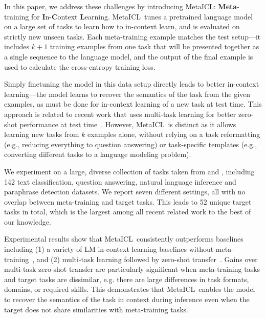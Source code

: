 In this paper, we address these challenges by introducing MetaICL: \textbf{Meta}-training for \textbf{I}n-\textbf{C}ontext \textbf{L}earning. MetaICL\ tunes a pretrained language model on a large set of tasks to learn how to in-context learn, and is evaluated on strictly new unseen tasks. Each meta-training example matches the test setup---it includes $k+1$ training examples from one task that will be presented together as a single sequence to the language model, and the output of the final example is used to calculate the cross-entropy training loss.

Simply finetuning the model in this data setup directly leads to better in-context learning---the model learns to recover the semantics of the task from the given examples, as must be done for in-context learning of a new task at test time. This approach is related to recent work that uses multi-task learning for better zero-shot performance at test time~\citep{ khashabi2020unifiedqa,zhong2021adapting,mishra2022cross,wei2022finetuned,sanh2022multitask}. However, MetaICL\ is distinct as it allows learning new tasks from $k$ examples alone, without relying on a task reformatting (e.g., reducing everything to question answering) or task-specific templates (e.g., converting different tasks to a language modeling problem).

We experiment on a large, diverse collection of tasks taken from \citet{ye2021crossfit} and \citet{khashabi2020unifiedqa}, including 142 text classification, question answering, natural language inference and paraphrase detection datasets. We report seven different settings, all with no overlap between meta-training and target tasks. This leads to 52 unique target tasks in total, which is the largest among all recent related work to the best of our knowledge.

Experimental results show that MetaICL\ consistently outperforms baselines including (1) a variety of LM in-context learning baselines without meta-training~\citep{brown2020language,zhao2021calibrate,holtzman2021surface,min2022noisy}, and (2) multi-task learning followed by zero-shot transfer~\citep{zhong2021adapting,wei2022finetuned,sanh2022multitask}. Gains over multi-task zero-shot transfer are particularly significant when meta-training tasks and target tasks are dissimilar, e.g. there are large differences in task formats, domains, or required skills. This demonstrates that MetaICL\ enables the model to recover the semantics of the task in context during inference even when the target does not share similarities with meta-training tasks.

